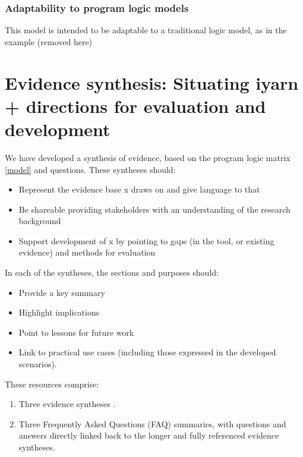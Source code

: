 \documentclass[
]{book}
\providecommand{\tightlist}{%
  \setlength{\itemsep}{0pt}\setlength{\parskip}{0pt}}
\begin{document}
\label{fig:model}

\hypertarget{adaptability-to-program-logic-models}{%
\subsection{Adaptability to program logic models}\label{adaptability-to-program-logic-models}}

This model is intended to be adaptable to a traditional logic model, as in the example (removed here)

\hypertarget{evidence-synthesis}{%
\chapter{Evidence synthesis: Situating iyarn + directions for evaluation and development}\label{evidence-synthesis}}

We have developed a synthesis of evidence, based on the program logic matrix \ref{model} and questions. These syntheses should:

\begin{itemize}
\tightlist
\item
  Represent the evidence base x draws on and give language to that
\item
  Be shareable providing stakeholders with an understanding of the research background
\item
  Support development of x by pointing to gaps (in the tool, or existing evidence) and methods for evaluation
\end{itemize}

In each of the syntheses, the sections and purposes should:

\begin{itemize}
\tightlist
\item
  Provide a key summary
\item
  Highlight implications\\
\item
  Point to lessons for future work
\item
  Link to practical use cases (including those expressed in the developed scenarios).
\end{itemize}

These resources comprise:

\begin{enumerate}
\def\labelenumi{\arabic{enumi}.}
\tightlist
\item
  {Three evidence syntheses }.
\item
  {Three Frequently Asked Questions (FAQ) summaries, with questions and answers directly linked back to the longer and fully referenced evidence syntheses}.
\end{enumerate}
\end{document}
